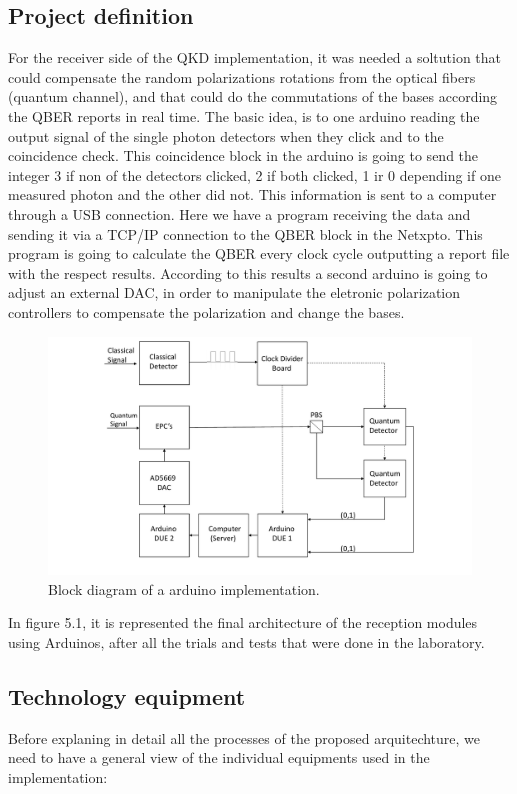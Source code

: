 \begin{refsection}
	\subsection{Project definition }
	For the receiver side of the QKD implementation, it was needed a soltution that could compensate the random polarizations rotations from the optical fibers (quantum channel), and that could do the commutations of the bases according the QBER reports in real time. The basic idea, is to one arduino reading the output signal of the single photon detectors when they click and to the coincidence check. This coincidence block in the arduino is going to send the integer 3 if non of the detectors clicked, 2 if both clicked, 1 ir 0 depending if one measured photon and the other did not. This information is sent to a computer through a USB connection. Here we have a program receiving the data and sending it via a TCP/IP connection to the QBER block in the Netxpto. This program is going to calculate the QBER every clock cycle outputting a report file with the respect results. According to this results a second arduino is going to adjust an external DAC, in order to manipulate the eletronic polarization controllers to compensate the polarization and change the bases.

	
		\begin{figure}[H] 
		\centering
		\includegraphics[width=1\linewidth]{./sdf/arduino_quantum_rx/figures/diagrama33.pdf}
		\caption{Block diagram of a arduino implementation.}
		\label{fig:netxpto}
		
	\end{figure}
	In figure 5.1, it is represented the final architecture  of the reception modules using Arduinos, after all the trials and tests that were done in the laboratory.
	
	\subsection{Technology equipment}
	Before explaning in detail all the processes of the proposed arquitechture, we need to have a general view of the individual equipments used in the implementation:
	

\end{refsection}
